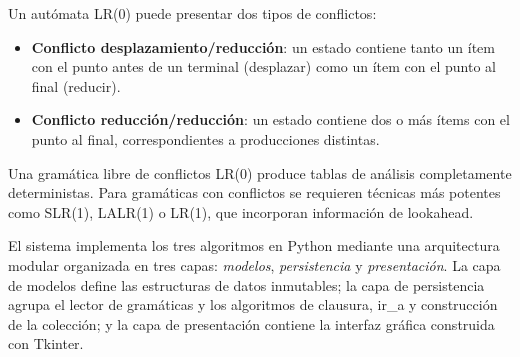 Un autómata LR(0) puede presentar dos tipos de conflictos:

\begin{itemize}
  \item \textbf{Conflicto desplazamiento/reducción}: un estado contiene tanto un ítem con
        el punto antes de un terminal (desplazar) como un ítem con el punto al final
        (reducir).
  \item \textbf{Conflicto reducción/reducción}: un estado contiene dos o más ítems con el
        punto al final, correspondientes a producciones distintas.
\end{itemize}

Una gramática libre de conflictos LR(0) produce tablas de análisis completamente
deterministas. Para gramáticas con conflictos se requieren técnicas más potentes como
SLR(1), LALR(1) o LR(1), que incorporan información de lookahead.

\vspace{0.8cm}

El sistema implementa los tres algoritmos en Python mediante una arquitectura modular
organizada en tres capas: \textit{modelos}, \textit{persistencia} y \textit{presentación}.
La capa de modelos define las estructuras de datos inmutables; la capa de persistencia
agrupa el lector de gramáticas y los algoritmos de clausura, ir\_a y construcción de la
colección; y la capa de presentación contiene la interfaz gráfica construida con Tkinter.
